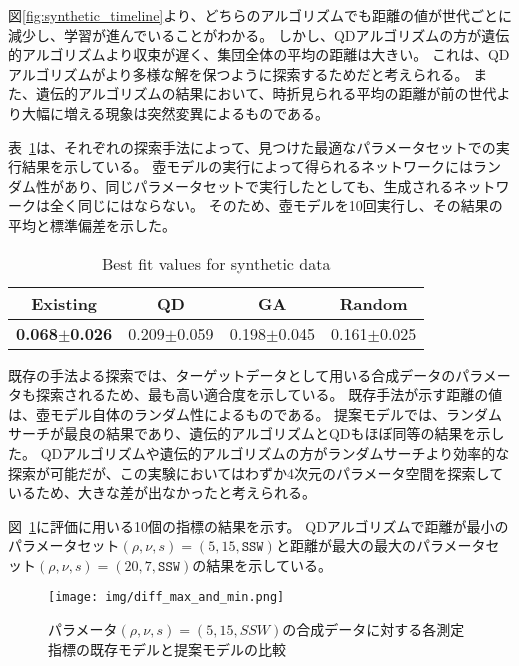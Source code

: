\documentclass[uplatex,11pt,openany]{ujreport}
\begin{document}
            図\ref{fig:synthetic_timeline}より、どちらのアルゴリズムでも距離の値が世代ごとに減少し、学習が進んでいることがわかる。
            しかし、QDアルゴリズムの方が遺伝的アルゴリズムより収束が遅く、集団全体の平均の距離は大きい。
            これは、QDアルゴリズムがより多様な解を保つように探索するためだと考えられる。
            また、遺伝的アルゴリズムの結果において、時折見られる平均の距離が前の世代より大幅に増える現象は突然変異によるものである。


            表~\ref{tab:best_synthetic_distance}は、それぞれの探索手法によって、見つけた最適なパラメータセットでの実行結果を示している。
            壺モデルの実行によって得られるネットワークにはランダム性があり、同じパラメータセットで実行したとしても、生成されるネットワークは全く同じにはならない。
            そのため、壺モデルを10回実行し、その結果の平均と標準偏差を示した。

            \begin{table}[H]
                \centering
                \caption{Best fit values for synthetic data}
                \label{tab:best_synthetic_distance}
                \begin{tabular}{cccc}
                \hline
                Existing    & QD          & GA          & Random      \\ \hline
                \textbf{0.068$\pm$0.026} & 0.209$\pm$0.059 & 0.198$\pm$0.045 & 0.161$\pm$0.025   \\   \hline
                \end{tabular}
            \end{table}

            既存の手法よる探索では、ターゲットデータとして用いる合成データのパラメータも探索されるため、最も高い適合度を示している。
            既存手法が示す距離の値は、壺モデル自体のランダム性によるものである。
            提案モデルでは、ランダムサーチが最良の結果であり、遺伝的アルゴリズムとQDもほぼ同等の結果を示した。
            QDアルゴリズムや遺伝的アルゴリズムの方がランダムサーチより効率的な探索が可能だが、この実験においてはわずか4次元のパラメータ空間を探索しているため、大きな差が出なかったと考えられる。


            図~\ref{fig:radar_chart_synthetic}に評価に用いる10個の指標の結果を示す。
            QDアルゴリズムで距離が最小のパラメータセット$(\rho, \nu, s) = (5, 15, \texttt{SSW})$と距離が最大の最大のパラメータセット$(\rho, \nu, s) = (20, 7, \texttt{SSW})$の結果を示している。

            \begin{figure}[htbp]
                \centering
                \texttt{[image: img/diff\_max\_and\_min.png]}
                \caption{パラメータ$(\rho,\nu,s)=(5,15,SSW)$の合成データに対する各測定指標の既存モデルと提案モデルの比較}
                \label{fig:radar_chart_synthetic}
            \end{figure}
\end{document}
